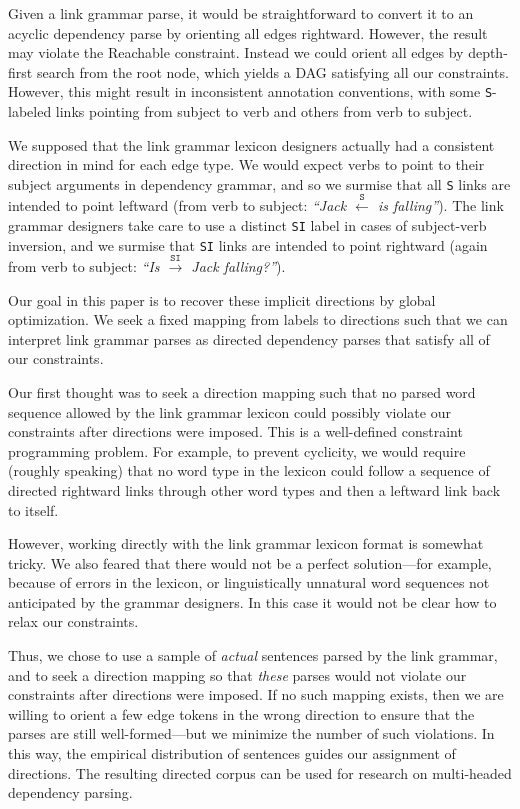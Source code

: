 \documentclass[11pt]{article}
\begin{document}
Given a link grammar parse, it would be straightforward to convert it to an acyclic dependency parse by orienting all edges rightward.  However, the result may violate the {\sc Reachable} constraint.  Instead we could orient all edges by depth-first search from the root node, which yields a DAG satisfying all our constraints.  However, this might result in inconsistent annotation conventions, with some \texttt{S}-labeled links pointing from subject to verb and others from verb to subject.  

We supposed that the link grammar lexicon designers actually had a consistent direction in mind for each edge type.  We would expect verbs to point to their subject arguments in dependency grammar, and so we surmise that all \texttt{S} links are intended to point leftward (from verb to subject: {\em ``Jack $\stackrel{\texttt{S}}{\leftarrow}$ is falling''}).  The link grammar designers take care to use a distinct \texttt{SI} label in cases of subject-verb inversion, and we surmise that \texttt{SI} links are intended to point rightward (again from verb to subject: {\em ``Is $\stackrel{\texttt{SI}}{\rightarrow}$ Jack falling?''}).

Our goal in this paper is to recover these implicit directions by global optimization.  We seek a fixed mapping from labels to directions such that we can interpret link grammar parses as directed dependency parses that satisfy all of our constraints.

Our first thought was to seek a direction mapping such that no parsed word sequence allowed by the link grammar lexicon could possibly violate our constraints after directions were imposed.  This is a well-defined constraint programming problem.  For example, to prevent cyclicity, we would require (roughly speaking) that no word type in the lexicon could follow a sequence of directed rightward links through other word types and then a leftward link back to itself.  

However, working directly with the link grammar lexicon format is somewhat tricky.  We also feared that there would not be a perfect solution---for example, because of errors in the lexicon, or linguistically unnatural word sequences not anticipated by the grammar designers.  In this case it would not be clear how to relax our constraints.

Thus, we chose to use a sample of {\em actual} sentences parsed by the link grammar, and to seek a direction mapping so that {\em these} parses would not violate our constraints after directions were imposed.  If no such mapping exists, then we are willing to orient a few edge tokens in the wrong direction to ensure that the parses are still well-formed---but we minimize the number of such violations.  In this way, the empirical distribution of sentences guides our assignment of directions.  The resulting directed corpus can be used for research on multi-headed dependency parsing.
\end{document}
